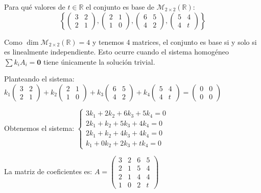 \begin{prob} Para qué valores de $t\in\mathbb{R}$ el conjunto es base de $\mathcal{M}_{2\times2}(\mathbb{R})$:
$$\left\{\begin{pmatrix}3&2\\2&1\end{pmatrix}, \begin{pmatrix}2&1\\1&0\end{pmatrix}, \begin{pmatrix}6&5\\4&2\end{pmatrix}, \begin{pmatrix}5&4\\4&t\end{pmatrix}\right\}$$

\begin{myproof}
Como $\dim \mathcal{M}_{2\times2}(\mathbb{R})=4$ y tenemos 4 matrices, el conjunto es base si y solo si es linealmente independiente. Esto ocurre cuando el sistema homogéneo $\sum k_i A_i = \mathbf{0}$ tiene únicamente la solución trivial.

Planteando el sistema: $k_1\begin{pmatrix}3&2\\2&1\end{pmatrix} + k_2\begin{pmatrix}2&1\\1&0\end{pmatrix} + k_3\begin{pmatrix}6&5\\4&2\end{pmatrix} + k_4\begin{pmatrix}5&4\\4&t\end{pmatrix} = \begin{pmatrix}0&0\\0&0\end{pmatrix}$

Obtenemos el sistema: $\begin{cases}
3k_1 + 2k_2 + 6k_3 + 5k_4 = 0 \\
2k_1 + k_2 + 5k_3 + 4k_4 = 0 \\
2k_1 + k_2 + 4k_3 + 4k_4 = 0 \\
k_1 + 0k_2 + 2k_3 + t k_4 = 0 
\end{cases}$

La matriz de coeficientes es: $A = \begin{pmatrix}
3 & 2 & 6 & 5 \\
2 & 1 & 5 & 4 \\
2 & 1 & 4 & 4 \\
1 & 0 & 2 & t 
\end{pmatrix}$


\end{myproof}
\end{prob}
